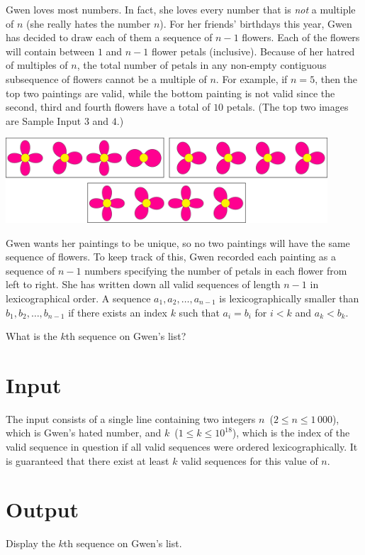 
Gwen loves most numbers. In fact, she loves every number that is \textit{not} a multiple of $n$ (she really hates the number $n$).
For her friends' birthdays this year, Gwen has decided to draw each of them a sequence of $n-1$ flowers.
Each of the flowers will contain between $1$ and $n-1$ flower petals (inclusive).
Because of her hatred of multiples of $n$, the total number of petals in
any non-empty contiguous subsequence of flowers cannot be a multiple of $n$. For example, if $n = 5$, then the top two paintings are valid,
while the bottom painting is not valid since the second, third and fourth flowers have a total of $10$ petals.
(The top two images are Sample Input $3$ and $4$.)

\begin{center}
 \includegraphics[width=0.9\textwidth]{gift-flowers.png}
\end{center}

Gwen wants her paintings to be unique, so no two paintings will have
the same sequence of flowers.  To keep track of this, Gwen recorded
each painting as a sequence of $n-1$ numbers specifying the number of
petals in each flower from left to right.  She has written down all
valid sequences of length $n-1$ in lexicographical order. A sequence
$a_1,a_2,\dots, a_{n-1}$ is lexicographically smaller than 
$b_1, b_2, \dots, b_{n-1}$ if there exists an index $k$ such that $a_i = b_i$
for $i < k$ and $a_k < b_k$.

What is the $k$th sequence on Gwen's list?


\section*{Input}

The input consists of a single line containing two integers $n$~($2 \leq n \leq 1\,000$),
which is Gwen's hated number, and $k$~($1 \leq k \leq 10^{18}$), which is the index of the valid sequence in question
if all valid sequences were ordered lexicographically.
It is guaranteed that there exist at least $k$ valid sequences for this value of $n$.


\section*{Output}

Display the $k$th sequence on Gwen's list.

